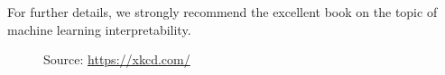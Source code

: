   \par For further details, we strongly recommend the excellent book \citep{molnar2019} on the topic of machine learning interpretability.

  \begin{figure}[!htbp]
    \centering
    \caption{Source: \url{https://xkcd.com/}}
    \label{fig:current_ml_comic}
  \end{figure}


